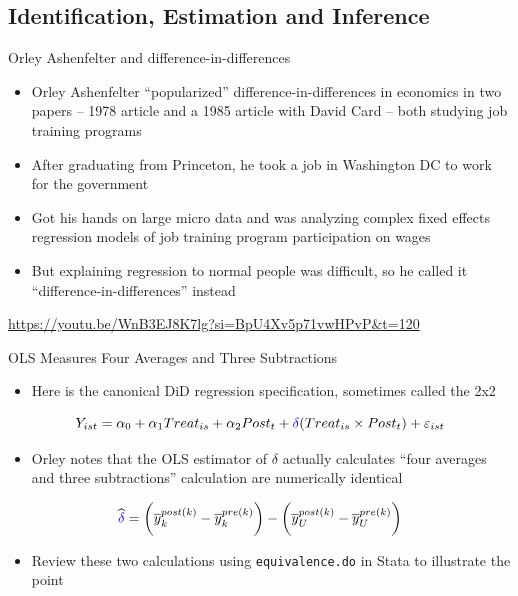 \documentclass{beamer}
\begin{document}
\subsection{Identification, Estimation and Inference}

\begin{frame}{Orley Ashenfelter and difference-in-differences}

\begin{itemize}
\item Orley Ashenfelter ``popularized'' difference-in-differences in economics in two papers -- 1978 article and a 1985 article with David Card -- both studying job training programs
\item After graduating from Princeton, he took a job in Washington DC to work for the government
\item Got his hands on large micro data and was analyzing complex fixed effects regression models of job training program participation on wages
\item But explaining regression to normal people was difficult, so he called it ``difference-in-differences'' instead
\end{itemize}

\url{https://youtu.be/WnB3EJ8K7lg?si=BpU4Xv5p71vwHPvP&t=120}

\end{frame}


\begin{frame}{OLS Measures Four Averages and Three Subtractions}
\begin{itemize}
\item Here is the canonical DiD regression specification, sometimes called the 2x2
\end{itemize}

$$Y_{ist} = \alpha_0 + \alpha_1 Treat_{is} + \alpha_2 Post_{t} + \textcolor{blue}{\delta} (Treat_{is} \times Post_t) + \varepsilon_{ist} $$

\bigskip

\begin{itemize}
\item Orley notes that the OLS estimator of $\delta$ actually calculates ``four averages and three subtractions'' calculation are numerically identical 
\end{itemize}

\bigskip

$$\widehat{\textcolor{blue}{\delta}} = \bigg ( \overline{y}_k^{post(k)} - \overline{y}_k^{pre(k)} \bigg ) - \bigg ( \overline{y}_U^{post(k)} - \overline{y}_U^{pre(k)} \bigg ) $$

\begin{itemize}
\item Review these two calculations using \texttt{equivalence.do} in Stata to illustrate the point
\end{itemize}


\end{frame}
\end{document}
